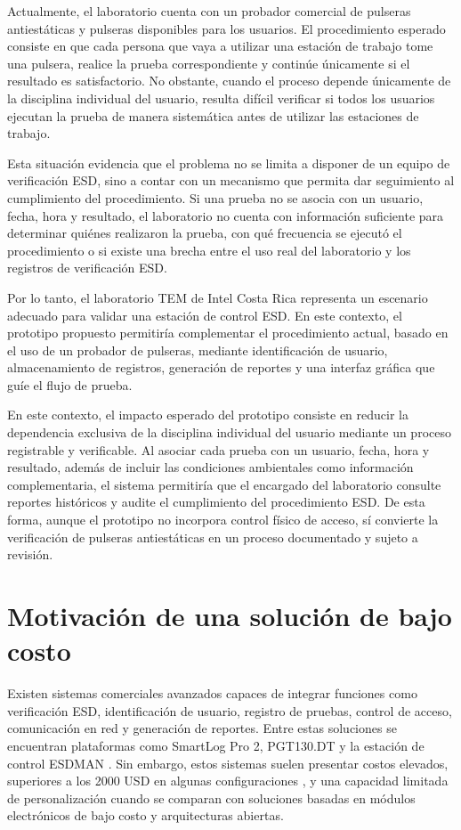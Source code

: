 Actualmente, el laboratorio cuenta con un probador comercial de pulseras antiestáticas y
pulseras disponibles para los usuarios. El procedimiento esperado consiste en que cada
persona que vaya a utilizar una estación de trabajo tome una pulsera, realice la prueba
correspondiente y continúe únicamente si el resultado es satisfactorio. No obstante,
cuando el proceso depende únicamente de la disciplina individual del usuario, resulta
difícil verificar si todos los usuarios ejecutan la prueba de manera sistemática antes de
utilizar las estaciones de trabajo.

Esta situación evidencia que el problema no se limita a disponer de un equipo de
verificación ESD, sino a contar con un mecanismo que permita dar seguimiento al
cumplimiento del procedimiento. Si una prueba no se asocia con un usuario, fecha, hora y
resultado, el laboratorio no cuenta con información suficiente para determinar quiénes
realizaron la prueba, con qué frecuencia se ejecutó el procedimiento o si existe una brecha
entre el uso real del laboratorio y los registros de verificación ESD.

Por lo tanto, el laboratorio TEM de Intel Costa Rica representa un escenario adecuado para
validar una estación de control ESD. En este contexto, el prototipo propuesto permitiría
complementar el procedimiento actual, basado en el uso de un probador de pulseras,
mediante identificación de usuario, almacenamiento de registros, generación de reportes y
una interfaz gráfica que guíe el flujo de prueba.

En este contexto, el impacto esperado del prototipo consiste en reducir la
dependencia exclusiva de la disciplina individual del usuario mediante un proceso
registrable y verificable. Al asociar cada prueba con un usuario, fecha, hora y
resultado, además de incluir las condiciones ambientales como información
complementaria, el sistema permitiría que el encargado del
laboratorio consulte reportes históricos y audite el cumplimiento del
procedimiento ESD. De esta forma, aunque el prototipo no incorpora control físico
de acceso, sí convierte la verificación de pulseras antiestáticas en un proceso
documentado y sujeto a revisión.

\section{Motivación de una solución de bajo costo}

Existen sistemas comerciales avanzados capaces de integrar funciones como verificación
ESD, identificación de usuario, registro de pruebas, control de acceso, comunicación en
red y generación de reportes. Entre estas soluciones se encuentran plataformas como
SmartLog Pro 2, PGT130.DT y la estación de control ESDMAN
\cite{SmartLogPro2} \cite{PGT130DT} \cite{ESDMAN_0016809}. Sin embargo, estos sistemas
suelen presentar costos elevados, superiores a los 2000 USD en algunas configuraciones
\cite{ESDMAN_0016809}, y una capacidad limitada de personalización cuando se comparan
con soluciones basadas en módulos electrónicos de bajo costo y arquitecturas abiertas.

